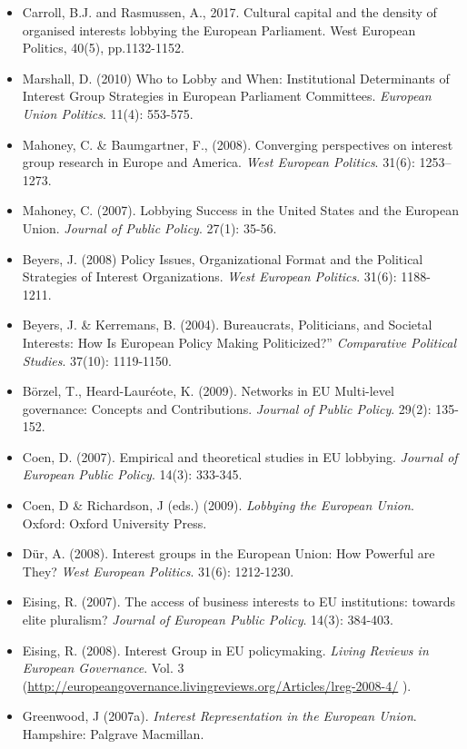 \begin{itemize}
	\item Carroll, B.J. and Rasmussen, A., 2017. Cultural capital and the density of organised interests lobbying the European Parliament. West European Politics, 40(5), pp.1132-1152.
	\item Marshall, D. (2010) Who to Lobby and When: Institutional Determinants of Interest Group Strategies in European Parliament Committees. \textit{European Union Politics}. 11(4): 553-575.
	\item Mahoney, C. \& Baumgartner, F., (2008). Converging perspectives on interest group research in Europe and America. \textit{West European Politics}. 31(6): 1253–1273.
	\item Mahoney, C. (2007). Lobbying Success in the United States and the European Union. \textit{Journal of Public Policy}. 27(1): 35-56.
	\item Beyers, J. (2008) Policy Issues, Organizational Format and the Political Strategies of Interest Organizations. \textit{West European Politics}. 31(6): 1188-1211.
	\item Beyers, J. \& Kerremans, B. (2004). Bureaucrats, Politicians, and Societal Interests: How Is European Policy Making Politicized?” \textit{Comparative Political Studies}. 37(10): 1119-1150.
	\item B\"{o}rzel, T., Heard-Laur\'{e}ote, K. (2009). Networks in EU Multi-level governance: Concepts and Contributions. \textit{Journal of Public Policy}. 29(2): 135-152.
	\item Coen, D. (2007). Empirical and theoretical studies in EU lobbying. \textit{Journal of European Public Policy}. 14(3): 333-345.
	\item Coen, D \& Richardson, J (eds.) (2009). \textit{Lobbying the European Union}. Oxford: Oxford University Press.
	\item D\"{u}r, A. (2008). Interest groups in the European Union: How Powerful are They? \textit{West European Politics}. 31(6): 1212-1230.
	\item Eising, R. (2007). The access of business interests to EU institutions: towards elite pluralism? \textit{Journal of European Public Policy}. 14(3): 384-403.
	\item Eising, R. (2008). Interest Group in EU policymaking. \textit{Living Reviews in European Governance}. Vol. 3 (\url{http://europeangovernance.livingreviews.org/Articles/lreg-2008-4/} ).
	\item Greenwood, J (2007a). \textit{Interest Representation in the European Union}. Hampshire: Palgrave Macmillan.

\end{itemize}
